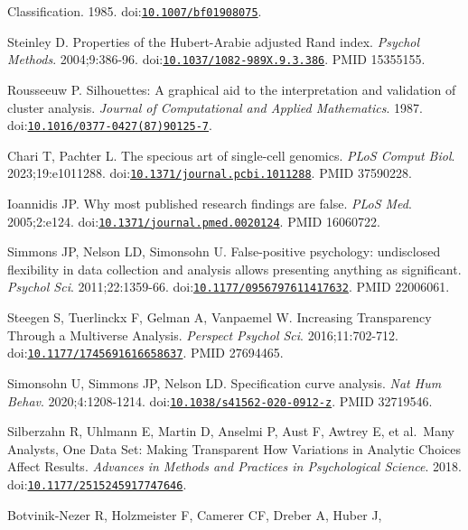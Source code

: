 \documentclass[11pt]{article}
\begin{document}
\begin{enumerate}[label={[\arabic*]},leftmargin=2.6em,labelsep=0.5em,itemsep=1.5pt]
{  Classification}. 1985.
  doi:\href{https://doi.org/10.1007/bf01908075}{\nolinkurl{10.1007/bf01908075}}.
\item
  Steinley D. Properties of the Hubert-Arabie adjusted Rand index.
  \emph{Psychol Methods}. 2004;9:386-96.
  doi:\href{https://doi.org/10.1037/1082-989X.9.3.386}{\nolinkurl{10.1037/1082-989X.9.3.386}}.
  PMID 15355155.
\item
  Rousseeuw P. Silhouettes: A graphical aid to the interpretation and
  validation of cluster analysis. \emph{Journal of Computational and
  Applied Mathematics}. 1987.
  doi:\href{https://doi.org/10.1016/0377-0427(87)90125-7}{\nolinkurl{10.1016/0377-0427(87)90125-7}}.
\item
  Chari T, Pachter L. The specious art of single-cell genomics.
  \emph{PLoS Comput Biol}. 2023;19:e1011288.
  doi:\href{https://doi.org/10.1371/journal.pcbi.1011288}{\nolinkurl{10.1371/journal.pcbi.1011288}}.
  PMID 37590228.
\item
  Ioannidis JP. Why most published research findings are false.
  \emph{PLoS Med}. 2005;2:e124.
  doi:\href{https://doi.org/10.1371/journal.pmed.0020124}{\nolinkurl{10.1371/journal.pmed.0020124}}.
  PMID 16060722.
\item
  Simmons JP, Nelson LD, Simonsohn U. False-positive psychology:
  undisclosed flexibility in data collection and analysis allows
  presenting anything as significant. \emph{Psychol Sci}.
  2011;22:1359-66.
  doi:\href{https://doi.org/10.1177/0956797611417632}{\nolinkurl{10.1177/0956797611417632}}.
  PMID 22006061.
\item
  Steegen S, Tuerlinckx F, Gelman A, Vanpaemel W. Increasing
  Transparency Through a Multiverse Analysis. \emph{Perspect Psychol
  Sci}. 2016;11:702-712.
  doi:\href{https://doi.org/10.1177/1745691616658637}{\nolinkurl{10.1177/1745691616658637}}.
  PMID 27694465.
\item
  Simonsohn U, Simmons JP, Nelson LD. Specification curve analysis.
  \emph{Nat Hum Behav}. 2020;4:1208-1214.
  doi:\href{https://doi.org/10.1038/s41562-020-0912-z}{\nolinkurl{10.1038/s41562-020-0912-z}}.
  PMID 32719546.
\item
  Silberzahn R, Uhlmann E, Martin D, Anselmi P, Aust F, Awtrey E, et
  al.~Many Analysts, One Data Set: Making Transparent How Variations in
  Analytic Choices Affect Results. \emph{Advances in Methods and
  Practices in Psychological Science}. 2018.
  doi:\href{https://doi.org/10.1177/2515245917747646}{\nolinkurl{10.1177/2515245917747646}}.
\item
  Botvinik-Nezer R, Holzmeister F, Camerer CF, Dreber A, Huber J,

\end{enumerate}
\end{document}
